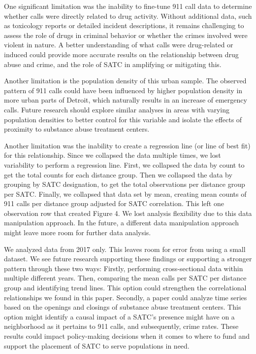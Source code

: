 \documentclass[12pt]{article}
\begin{document}
One significant limitation was the inability to fine-tune 911 call data to determine whether calls were directly related to drug activity. Without additional data, such as toxicology reports or detailed incident descriptions, it remains challenging to assess the role of drugs in criminal behavior or whether the crimes involved were violent in nature. A better understanding of what calls were drug-related or induced could provide more accurate results on the relationship between drug abuse and crime, and the role of SATC in amplifying or mitigating this. 
    
Another limitation is the population density of this urban sample. The observed pattern of 911 calls could have been influenced by higher population density in more urban parts of Detroit, which naturally results in an increase of emergency calls. Future research should explore similar analyses in areas with varying population densities to better control for this variable and isolate the effects of proximity to substance abuse treatment centers. 

Another limitation was the inability to create a regression line (or line of best fit) for this relationship. Since we collapsed the data multiple times, we lost variability to perform a regression line. First, we collapsed the data by count to get the total counts for each distance group. Then we collapsed the data by grouping by SATC designation, to get the total observations per distance group per SATC. Finally, we collapsed that data set by mean, creating mean counts of 911 calls per distance group adjusted for SATC correlation. This left one observation row that created Figure 4. We lost analysis flexibility due to this data manipulation approach. In the future, a different data manipulation approach might leave more room for further data analysis. 

We analyzed data from 2017 only. This leaves room for error from using a small dataset. We see future research supporting these findings or supporting a stronger pattern through these two ways: Firstly, performing cross-sectional data within multiple different years. Then, comparing the mean calls per SATC per distance group and identifying trend lines. This option could strengthen the correlational relationships we found in this paper. Secondly, a paper could analyze time series based on the openings and closings of substance abuse treatment centers. This option might identify a causal impact of a SATC's presence might have on a neighborhood as it pertains to 911 calls, and subsequently, crime rates. These results could impact policy-making decisions when it comes to where to fund and support the placement of SATC to serve populations in need. 
\end{document}
